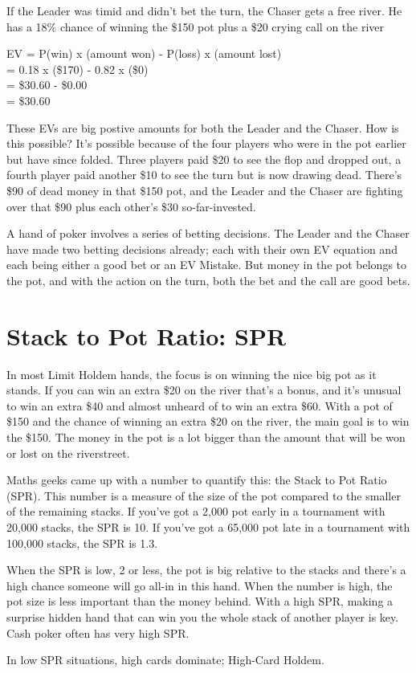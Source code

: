 If the Leader was timid and didn't bet the turn, the Chaser gets a
free river. He has a 18\% chance of winning the \$150 pot plus a \$20
crying call on the river

EV = P(win) x (amount won) - P(loss) x (amount lost) \\
   = 0.18 x (\$170) - 0.82 x (\$0) \\
   = \$30.60 - \$0.00 \\
   = \$30.60


These EVs are big postive amounts for both the Leader and the
Chaser. How is this possible? It's possible because of the four
players who were in the pot earlier but have since folded. Three
players paid \$20 to see the flop and dropped out, a fourth player
paid another \$10 to see the turn but is now drawing dead. There's
\$90 of dead money in that \$150 pot, and the Leader and the Chaser
are fighting over that \$90 plus each other's \$30 so-far-invested.

A hand of poker involves a series of betting decisions. The Leader and
the Chaser have made two betting decisions already; each with their
own EV equation and each being either a good bet or an EV Mistake. But
money in the pot belongs to the pot, and with the action on the turn,
both the bet and the call are good bets.

\section{Stack to Pot Ratio: SPR}

In most Limit Holdem hands, the focus is on winning the nice big pot
as it stands. If you can win an extra \$20 on the river that's a
bonus, and it's unusual to win an extra \$40 and almost unheard of to
win an extra \$60. With a pot of \$150 and the chance of winning an
extra \$20 on the river, the main goal is to win the \$150.
The money in the pot is a lot bigger than the amount that will be
won or lost on the riverstreet.

Maths geeks came up with a number to quantify this: the Stack to Pot
Ratio (SPR). This number is a measure of the size of the pot compared
to the smaller of the remaining stacks. If you've got a 2,000 pot early
in a tournament with 20,000 stacks, the SPR is 10. If you've got a 65,000
pot late in a tournament with 100,000 stacks, the SPR is 1.3.

When the SPR is low, 2 or less, the pot is big relative to the stacks
and there's a high chance someone will go all-in in this hand. When
the number is high, the pot size is less important than the money behind.
With a high SPR, making a surprise hidden hand that can win you the whole
stack of another player is key. Cash poker often has very high SPR.

In low SPR situations, high cards dominate; High-Card Holdem.

